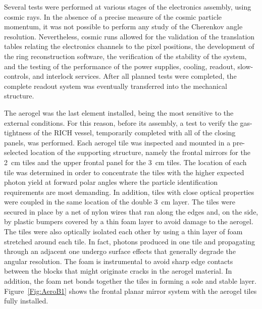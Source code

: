 \documentclass[5p,times,twocolumn]{elsarticle}
\begin{document}
Several tests were performed at various stages of the electronics assembly, using cosmic rays.
In the absence of a precise measure of the cosmic particle momentum, it was not possible to perform any study of
the Cherenkov angle resolution. Nevertheless, cosmic runs allowed for the validation of the translation tables relating
the electronics channels to the pixel positions, the development of the ring reconstruction software, the verification of
the stability of the system, and the testing of the performance of the power supplies, cooling, readout, slow-controls,
and interlock services. After all planned tests were completed, the complete readout system was eventually transferred
into the mechanical structure.

The aerogel was the last element installed, being the most sensitive to the external conditions. For this reason, before
its assembly, a test to verify the gas-tightness of the RICH vessel, temporarily completed with all of the closing panels,
was performed. Each aerogel tile was inspected and mounted in a pre-selected location of the supporting structure,
namely the frontal mirrors for the 2~cm tiles and the upper frontal panel for the 3~cm tiles. The location of
each tile was determined in order to concentrate the tiles with the higher expected photon yield at forward polar
angles where the particle identification requirements are most demanding. In addition, tiles with close optical
properties were coupled in the same location of the double 3~cm layer. The tiles were secured in place by a net of
nylon wires that ran along the edges and, on the side, by plastic bumpers covered by a thin foam layer to avoid
damage to the aerogel. The tiles were also optically isolated each other by using a thin layer of foam stretched around
each tile. In fact, photons produced in one tile and propagating through an adjacent one undergo surface effects that
generally degrade the angular resolution. The foam is instrumental to avoid sharp edge contacts between the blocks
that might originate cracks in the aerogel material. In addition, the foam net bonds together the tiles in forming a sole
and stable layer. Figure~\ref{Fig:AeroB1} shows the frontal planar mirror system with the aerogel tiles fully installed.
\end{document}
